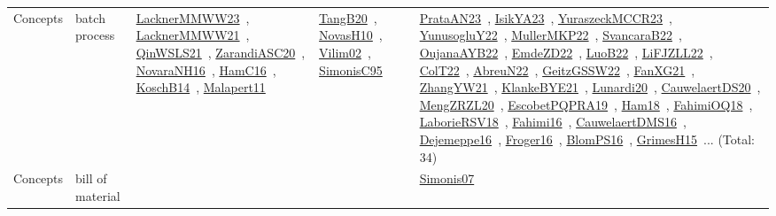 {\begin{longtable}{lp{3cm}>{\raggedright\arraybackslash}p{6cm}>{\raggedright\arraybackslash}p{6cm}>{\raggedright\arraybackslash}p{8cm}}
Concepts & batch process & \href{works/LacknerMMWW23.pdf}{LacknerMMWW23}~\cite{LacknerMMWW23}, \href{works/LacknerMMWW21.pdf}{LacknerMMWW21}~\cite{LacknerMMWW21}, \href{works/QinWSLS21.pdf}{QinWSLS21}~\cite{QinWSLS21}, \href{works/ZarandiASC20.pdf}{ZarandiASC20}~\cite{ZarandiASC20}, \href{works/NovaraNH16.pdf}{NovaraNH16}~\cite{NovaraNH16}, \href{works/HamC16.pdf}{HamC16}~\cite{HamC16}, \href{works/KoschB14.pdf}{KoschB14}~\cite{KoschB14}, \href{works/Malapert11.pdf}{Malapert11}~\cite{Malapert11} & \href{works/TangB20.pdf}{TangB20}~\cite{TangB20}, \href{works/NovasH10.pdf}{NovasH10}~\cite{NovasH10}, \href{works/Vilim02.pdf}{Vilim02}~\cite{Vilim02}, \href{works/SimonisC95.pdf}{SimonisC95}~\cite{SimonisC95} & \href{works/PrataAN23.pdf}{PrataAN23}~\cite{PrataAN23}, \href{works/IsikYA23.pdf}{IsikYA23}~\cite{IsikYA23}, \href{works/YuraszeckMCCR23.pdf}{YuraszeckMCCR23}~\cite{YuraszeckMCCR23}, \href{works/YunusogluY22.pdf}{YunusogluY22}~\cite{YunusogluY22}, \href{works/MullerMKP22.pdf}{MullerMKP22}~\cite{MullerMKP22}, \href{works/SvancaraB22.pdf}{SvancaraB22}~\cite{SvancaraB22}, \href{works/OujanaAYB22.pdf}{OujanaAYB22}~\cite{OujanaAYB22}, \href{works/EmdeZD22.pdf}{EmdeZD22}~\cite{EmdeZD22}, \href{works/LuoB22.pdf}{LuoB22}~\cite{LuoB22}, \href{works/LiFJZLL22.pdf}{LiFJZLL22}~\cite{LiFJZLL22}, \href{works/ColT22.pdf}{ColT22}~\cite{ColT22}, \href{works/AbreuN22.pdf}{AbreuN22}~\cite{AbreuN22}, \href{works/GeitzGSSW22.pdf}{GeitzGSSW22}~\cite{GeitzGSSW22}, \href{works/FanXG21.pdf}{FanXG21}~\cite{FanXG21}, \href{works/ZhangYW21.pdf}{ZhangYW21}~\cite{ZhangYW21}, \href{works/KlankeBYE21.pdf}{KlankeBYE21}~\cite{KlankeBYE21}, \href{works/Lunardi20.pdf}{Lunardi20}~\cite{Lunardi20}, \href{works/CauwelaertDS20.pdf}{CauwelaertDS20}~\cite{CauwelaertDS20}, \href{works/MengZRZL20.pdf}{MengZRZL20}~\cite{MengZRZL20}, \href{works/EscobetPQPRA19.pdf}{EscobetPQPRA19}~\cite{EscobetPQPRA19}, \href{works/Ham18.pdf}{Ham18}~\cite{Ham18}, \href{works/FahimiOQ18.pdf}{FahimiOQ18}~\cite{FahimiOQ18}, \href{works/LaborieRSV18.pdf}{LaborieRSV18}~\cite{LaborieRSV18}, \href{works/Fahimi16.pdf}{Fahimi16}~\cite{Fahimi16}, \href{works/CauwelaertDMS16.pdf}{CauwelaertDMS16}~\cite{CauwelaertDMS16}, \href{works/Dejemeppe16.pdf}{Dejemeppe16}~\cite{Dejemeppe16}, \href{works/Froger16.pdf}{Froger16}~\cite{Froger16}, \href{works/BlomPS16.pdf}{BlomPS16}~\cite{BlomPS16}, \href{works/GrimesH15.pdf}{GrimesH15}~\cite{GrimesH15}... (Total: 34)\\
Concepts & bill of material &  &  & \href{works/Simonis07.pdf}{Simonis07}~\cite{Simonis07}\\

\end{longtable}}
